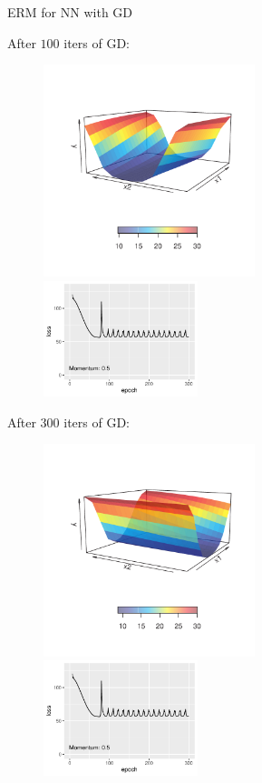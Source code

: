 \documentclass[11pt,compress,t,notes=noshow, xcolor=table]{beamer}
\begin{document}
\begin{vbframe}{ERM for NN with GD}
\framebreak 

After $100$ iters of GD: 

\begin{figure}
	\includegraphics[width=0.55\textwidth]{figure_man/gradient_descent_NN_100_surface_0.5.pdf} ~~ \includegraphics[width=0.4\textwidth]{figure_man/gradient_descent_NN_300_history_0.5.pdf}
\end{figure}

\framebreak 

After $300$ iters of GD:

\begin{figure}
	\includegraphics[width=0.55\textwidth]{figure_man/gradient_descent_NN_300_surface_0.5.pdf} ~~ \includegraphics[width=0.4\textwidth]{figure_man/gradient_descent_NN_300_history_0.5.pdf}
\end{figure}


\end{vbframe}
\end{document}

